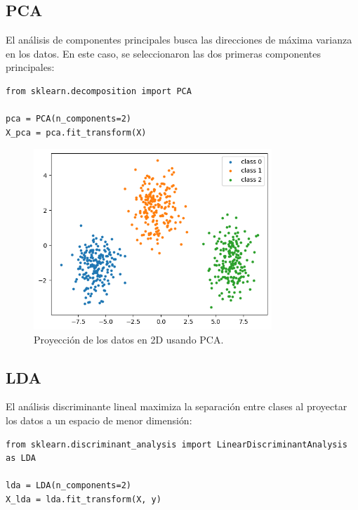 \documentclass[paper=a4, fontsize=11pt]{scrartcl} %
\numberwithin{equation}{section} %
\numberwithin{figure}{section} %
\numberwithin{table}{section} %
\begin{document}
\subsection{PCA}
El análisis de componentes principales busca las direcciones de máxima varianza en los datos. En este caso, se seleccionaron las dos primeras componentes principales:

\begin{verbatim}
from sklearn.decomposition import PCA

pca = PCA(n_components=2)
X_pca = pca.fit_transform(X)
\end{verbatim}

\begin{figure}[H]
\centering
\includegraphics[width=0.8\textwidth]{images/pca_projection.png}
\caption{Proyección de los datos en 2D usando PCA.}
\end{figure}

\subsection{LDA}
El análisis discriminante lineal maximiza la separación entre clases al proyectar los datos a un espacio de menor dimensión:

\begin{verbatim}
from sklearn.discriminant_analysis import LinearDiscriminantAnalysis as LDA

lda = LDA(n_components=2)
X_lda = lda.fit_transform(X, y)
\end{verbatim}
\end{document}
